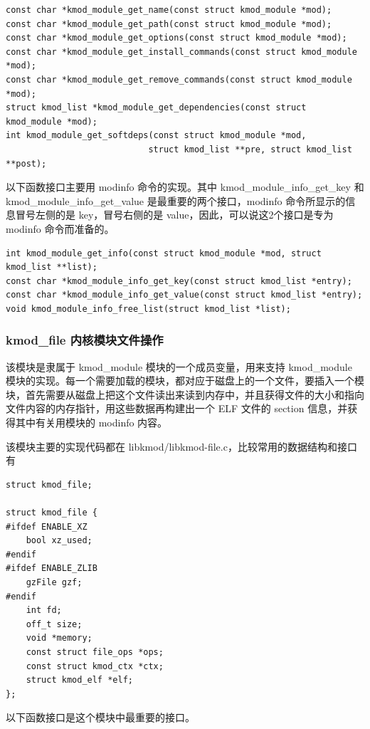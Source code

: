 \documentclass[11pt,a4paper]{article}
\begin{document}
{\begin{shaded}\begin{verbatim}
const char *kmod_module_get_name(const struct kmod_module *mod);
const char *kmod_module_get_path(const struct kmod_module *mod);
const char *kmod_module_get_options(const struct kmod_module *mod);
const char *kmod_module_get_install_commands(const struct kmod_module *mod);
const char *kmod_module_get_remove_commands(const struct kmod_module *mod);
struct kmod_list *kmod_module_get_dependencies(const struct kmod_module *mod);
int kmod_module_get_softdeps(const struct kmod_module *mod,
                            struct kmod_list **pre, struct kmod_list **post);
\end{verbatim}\end{shaded}}
以下函数接口主要用 modinfo 命令的实现。其中 kmod\_module\_info\_get\_key
和 kmod\_module\_info\_get\_value 是最重要的两个接口，modinfo
命令所显示的信息冒号左侧的是 key，冒号右侧的是
value，因此，可以说这2个接口是专为 modinfo 命令而准备的。

{\begin{shaded}\begin{verbatim}
int kmod_module_get_info(const struct kmod_module *mod, struct kmod_list **list);
const char *kmod_module_info_get_key(const struct kmod_list *entry);
const char *kmod_module_info_get_value(const struct kmod_list *entry);
void kmod_module_info_free_list(struct kmod_list *list);
\end{verbatim}\end{shaded}}
\subsubsection{kmod\_file 内核模块文件操作}

该模块是隶属于 kmod\_module 模块的一个成员变量，用来支持 kmod\_module
模块的实现。每一个需要加载的模块，都对应于磁盘上的一个文件，要插入一个模块，首先需要从磁盘上把这个文件读出来读到内存中，并且获得文件的大小和指向文件内容的内存指针，用这些数据再构建出一个
ELF 文件的 section 信息，并获得其中有关用模块的 modinfo 内容。

该模块主要的实现代码都在
libkmod/libkmod-file.c，比较常用的数据结构和接口有

{\begin{shaded}\begin{verbatim}
struct kmod_file;

struct kmod_file {
#ifdef ENABLE_XZ
    bool xz_used;
#endif
#ifdef ENABLE_ZLIB
    gzFile gzf;
#endif
    int fd; 
    off_t size;
    void *memory;
    const struct file_ops *ops;
    const struct kmod_ctx *ctx;
    struct kmod_elf *elf;
};
\end{verbatim}\end{shaded}}
以下函数接口是这个模块中最重要的接口。
\end{document}
